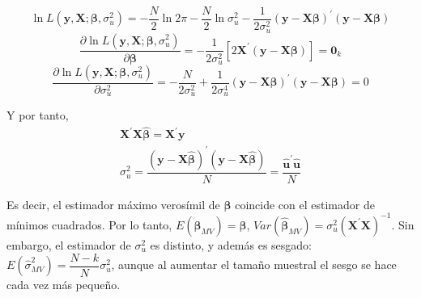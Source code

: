 \begin{equation*}
\ln{L\left(\boldsymbol{y},\boldsymbol{X};\boldsymbol{\beta},\sigma_{u}^{2}\right)}=-\dfrac{N}{2}\ln{2\pi}-\dfrac{N}{2}\ln{\sigma_{u}^{2}}-\dfrac{1}{2\sigma_{u}^{2}}\left(\boldsymbol{y}-\boldsymbol{X}\boldsymbol{\beta}\right)^{\prime}\left(\boldsymbol{y}-\boldsymbol{X}\boldsymbol{\beta}\right)
\end{equation*}
\begin{equation*}
\dfrac{\partial{\ln{L\left(\boldsymbol{y},\boldsymbol{X};\boldsymbol{\beta},\sigma_{u}^{2}\right)}}}{\partial{\boldsymbol{\beta}}}=-\dfrac{1}{2\sigma_{u}^{2}}\left[2\boldsymbol{X}^{\prime}\left(\boldsymbol{y}-\boldsymbol{X}\boldsymbol{\beta}\right)\right]=\boldsymbol{0}_{k}
\end{equation*}
\begin{equation*}
\dfrac{\partial{\ln{L\left(\boldsymbol{y},\boldsymbol{X};\boldsymbol{\beta},\sigma_{u}^{2}\right)}}}{\partial{\sigma_{u}^{2}}}=-\dfrac{N}{2\sigma_{u}^{2}}+\dfrac{1}{2\sigma_{u}^{4}}\left(\boldsymbol{y}-\boldsymbol{X}\boldsymbol{\beta}\right)^{\prime}\left(\boldsymbol{y}-\boldsymbol{X}\boldsymbol{\beta}\right)=0
\end{equation*}


Y por tanto,
\begin{equation*}
\begin{array}{c}
\boldsymbol{X}^{\prime}\boldsymbol{X}\hat{\boldsymbol{\beta}}=\boldsymbol{X}^{\prime}\boldsymbol{y}\\
\sigma_{u}^{2}=\dfrac{\left(\boldsymbol{y}-\boldsymbol{X}\hat{\boldsymbol{\beta}}\right)^{\prime}\left(\boldsymbol{y}-\boldsymbol{X}\hat{\boldsymbol{\beta}}\right)}{N}=\dfrac{\hat{\boldsymbol{u}}^{\prime}\hat{\boldsymbol{u}}}{N}
\end{array}
\end{equation*}


Es decir, el estimador m\'aximo veros\'imil de $\boldsymbol{\beta}$ coincide
con el estimador de m\'inimos cuadrados. Por lo tanto, $E\left(\hat{\boldsymbol{\beta}}_{MV}\right)=\boldsymbol{\beta}$,
$Var\left(\hat{\boldsymbol{\beta}}_{MV}\right)=\sigma_{u}^{2}\left(\boldsymbol{X}^{\prime}\boldsymbol{X}\right)^{-1}$.
Sin embargo, el estimador de $\sigma_{u}^{2}$ es distinto, y adem\'as
es sesgado: $E\left(\hat{\sigma}_{MV}^{2}\right)=\dfrac{N-k}{N}\sigma_{u}^{2}$,
aunque al aumentar el tama\~no muestral el sesgo se hace cada vez m\'as
peque\~no.

